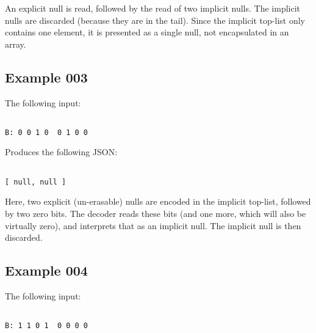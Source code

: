 An explicit null is read, followed by the read of two implicit nulls.
The implicit nulls are discarded (because they are in the tail).
Since the implicit top-list only contains one element, it is presented
as a single null, not encapsulated in an array.

\subsection{Example 003}

The following input:

\begin{changemargin}{-60mm}{0mm}
\begin{myquote}
\begin{verbatim}

B: 0 0 1 0  0 1 0 0

\end{verbatim}
\end{myquote}
\end{changemargin}

Produces the following JSON:

\begin{changemargin}{-60mm}{0mm}
\begin{myquote}
\begin{verbatim}

[ null, null ]

\end{verbatim}
\end{myquote}
\end{changemargin}

Here, two explicit (un-erasable) nulls are encoded in the implicit
top-list, followed by two zero bits. The decoder reads these bits
(and one more, which will also be virtually zero), and interprets that
as an implicit null. The implicit null is then discarded.

\subsection{Example 004}

The following input:

\begin{changemargin}{-60mm}{0mm}
\begin{myquote}
\begin{verbatim}

B: 1 1 0 1  0 0 0 0

\end{verbatim}
\end{myquote}
\end{changemargin}

